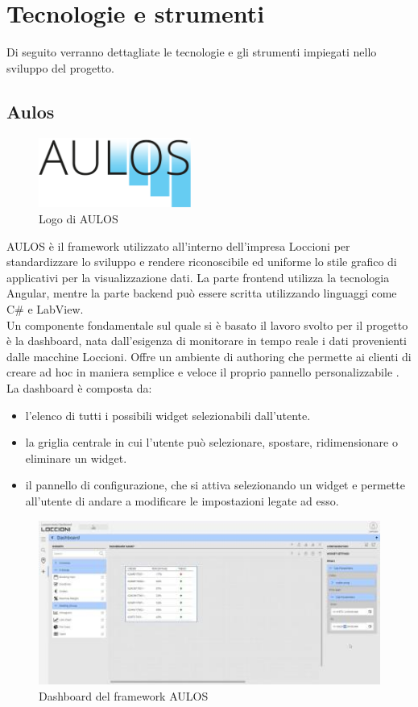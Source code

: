 \chapter{Tecnologie e strumenti}
\label{chap:tecnologie_strumenti}
Di seguito verranno dettagliate le tecnologie e gli strumenti impiegati nello sviluppo del progetto.

\section{Aulos}
\label{chap:aulos}
\begin{figure}[h]
\begin{center}
  \includegraphics[width=5cm]{images/aulos_logo.png}
  \caption{Logo di AULOS}
\end{center}
\end{figure}
AULOS è il framework utilizzato all'interno dell'impresa Loccioni per standardizzare lo sviluppo e rendere riconoscibile ed uniforme lo stile grafico di applicativi per la visualizzazione dati. La parte frontend utilizza la tecnologia Angular, mentre la parte backend può essere scritta utilizzando linguaggi come C\# e LabView.\\
Un componente fondamentale sul quale si è basato il lavoro svolto per il progetto è la dashboard, nata dall'esigenza di monitorare in tempo reale i dati provenienti dalle macchine Loccioni. Offre un ambiente di authoring che permette ai clienti di creare ad hoc in maniera semplice e veloce il proprio pannello personalizzabile \cite{AULOS}.
La dashboard è composta da:
\begin{itemize}
    \item l'elenco di tutti i possibili widget selezionabili dall'utente.
    \item la griglia centrale in cui l'utente può selezionare, spostare, ridimensionare o eliminare un widget.
    \item il pannello di configurazione, che si attiva selezionando un widget e permette all'utente di andare a modificare le impostazioni legate ad esso. 
\end{itemize}
\begin{figure}[h]
\begin{center}
  \includegraphics[width=14cm]{images/dashboard_aulos.JPG}
  \caption{Dashboard del framework AULOS}
\end{center}
\end{figure}
